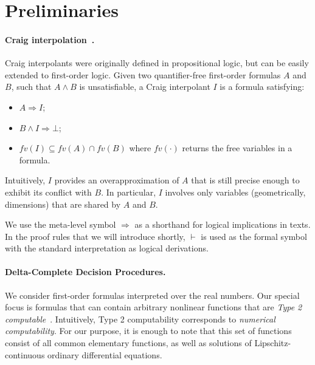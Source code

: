 \section{Preliminaries}
\label{sec:prelim}

\paragraph{Craig interpolation~\cite{MR0104564}.}
Craig interpolants were originally defined in propositional logic, but can be easily extended to first-order logic. Given two quantifier-free first-order formulas $A$ and $B$, such that $A ∧ B$ is unsatisfiable, a Craig interpolant $I$ is a formula satisfying:
\begin{itemize}
\item $A ⇒ I$;
\item $B ∧ I ⇒ ⊥$;
\item $fv(I) ⊆ fv(A) ∩ fv(B)$ where $fv(\cdot)$ returns the free variables in a formula.
\end{itemize}
Intuitively, $I$ provides an overapproximation of $A$ that is still precise enough to exhibit its conflict with $B$. In particular, $I$ involves only variables (geometrically, dimensions) that are shared by $A$ and $B$.  
\begin{notation}
We use the meta-level symbol $\Rightarrow$ as a shorthand for logical implications in texts. In the proof rules that we will introduce shortly, $\vdash$ is used as the formal symbol with the standard interpretation as logical derivations. 
\end{notation}

\paragraph{Delta-Complete Decision Procedures.}

We consider first-order formulas interpreted over the real numbers. Our special focus is formulas that can contain arbitrary nonlinear functions that are {\em Type 2 computable}~\cite{CAbook,vasco}. Intuitively, Type 2 computability corresponds to {\em numerical computability}. For our purpose, it is enough to note that this set of functions consist of all common elementary functions, as well as solutions of Lipschitz-continuous ordinary differential equations. 

